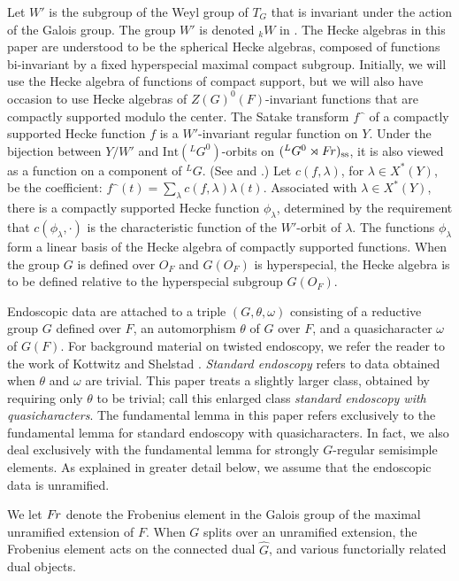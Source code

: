 Let $W'$ is the subgroup of the Weyl group of $T_G$ that is
invariant under the action of the Galois group.
The group $W'$ is denoted ${}_k\!W$ in \cite{B}.
The Hecke algebras in this paper are understood to be
the spherical Hecke algebras, composed of functions bi-invariant
by a fixed hyperspecial maximal compact subgroup.  Initially,
we will use the Hecke algebra of functions of compact support,
but we will also have occasion to use Hecke algebras of
$Z(G)^0(F)$-invariant functions that
are compactly supported modulo the center.  
The Satake transform $f\hat{\phantom{o}}$ of a compactly supported Hecke
function $f$ is 
a $W'$-invariant regular function
on $Y$.  Under the bijection between $Y/W'$ and $\text{Int}({}^LG^0)$-orbits
on $({}^LG^0\rtimes\text{$F\hskip-.1em r$})_{\text{ss}}$, it is also viewed as a
function on a component of ${}^L\!G$.  (See \cite{M} and \cite{B}.)
Let $c(f,\lambda)$, for $\lambda\in X^*(Y)$, be the coefficient:
$f\hat{\phantom{o}}(t) = \sum_\lambda c(f,\lambda) \lambda(t)$.
Associated with $\lambda\in X^*(Y)$,
there is a compactly supported Hecke function $\phi_\lambda$,
determined by the requirement that $c(\phi_\lambda,\cdot)$
is the characteristic function of the $W'$-orbit of $\lambda$.
The functions $\phi_\lambda$
form a linear basis of the Hecke algebra of compactly supported
functions.  When the group $G$ is defined over $O_F$ and
$G(O_F)$ is hyperspecial, the
Hecke algebra is to be defined relative to the hyperspecial
subgroup $G(O_F)$.

Endoscopic data are attached to a triple $(G,\theta,\omega)$
consisting of a reductive group $G$ defined over $F$, 
an automorphism $\theta$  of $G$ over $F$, and a quasicharacter
$\omega$
of $G(F)$.  For background material on twisted endoscopy, we refer
the reader to the work of
Kottwitz and Shelstad \cite{KS1}.
{\it Standard endoscopy}
refers to data obtained when $\theta$ and $\omega$ are trivial.
This paper treats a slightly larger class, obtained by
requiring only $\theta$ to be trivial; call this
enlarged class {\it standard endoscopy with quasicharacters}.
The fundamental lemma in this paper refers exclusively
to the fundamental lemma for standard endoscopy with 
quasicharacters.  In fact, we also deal exclusively with
the fundamental lemma for strongly $G$-regular semisimple
elements.  As explained in greater detail below, we assume that
the endoscopic data is unramified.  

We let $\text{$F\hskip-.1em r$}$ denote the Frobenius element in the Galois group of the maximal
unramified extension of $F$.  When $G$ splits over an unramified extension,
the Frobenius element acts on the connected dual $\hat G$, and various
functorially related dual objects.  

